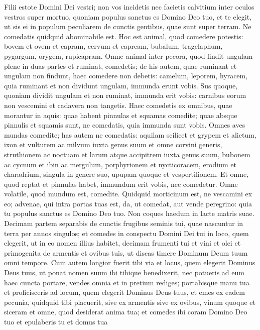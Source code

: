 \begin{biblechapter}
\begin{biblechapter}
\begin{biblechapter}
\begin{biblechapter}
\begin{biblechapter}
\begin{biblechapter}
\begin{biblechapter}
\begin{biblechapter}
\begin{biblechapter}
\begin{biblechapter}
\begin{biblechapter}
\begin{biblechapter}
\begin{biblechapter}
\begin{biblechapter}
 \verse Filii estote Domini Dei vestri; non vos incidetis nec facietis calvitium inter oculos vestros super mortuo, 
\verse quoniam populus sanctus es Domino Deo tuo, et te elegit, ut sis ei in populum peculiarem de cunctis gentibus, quae sunt super terram.
 \verse Ne comedatis quidquid abominabile est.
 \verse Hoc est animal, quod comedere potestis: bovem et ovem et capram, 
\verse cervum et capream, bubalum, tragelaphum, pygargum, orygem, rupicapram. 
\verse Omne animal inter pecora, quod findit ungulam plene in duas partes et ruminat, comedetis; 
\verse de his autem, quae ruminant et ungulam non findunt, haec comedere non debetis: camelum, leporem, hyracem, quia ruminant et non dividunt ungulam, immunda erunt vobis. 
\verse Sus quoque, quoniam dividit ungulam et non ruminat, immunda erit vobis: carnibus eorum non vescemini et cadavera non tangetis.
 \verse Haec comedetis ex omnibus, quae morantur in aquis: quae habent pinnulas et squamas comedite; 
\verse quae absque pinnulis et squamis sunt, ne comedatis, quia immunda sunt vobis.
 \verse Omnes aves mundas comedite; 
\verse has autem ne comedatis: aquilam scilicet et grypem et alietum, 
\verse ixon et vulturem ac milvum iuxta genus suum 
\verse et omne corvini generis, 
\verse struthionem ac noctuam et larum atque accipitrem iuxta genus suum, 
\verse bubonem ac cycnum et ibin 
\verse ac mergulum, porphyrionem et nycticoracem, 
\verse erodium et charadrium, singula in genere suo, upupam quoque et vespertilionem. 
\verse Et omne, quod reptat et pinnulas habet, immundum erit vobis, nec comedetur. 
\verse Omne volatile, quod mundum est, comedite.
 \verse Quidquid morticinum est, ne vescamini ex eo; advenae, qui intra portas tuas est, da, ut comedat, aut vende peregrino: quia tu populus sanctus es Domino Deo tuo.
 Non coques haedum in lacte matris suae.
 \verse Decimam partem separabis de cunctis frugibus seminis tui, quae nascuntur in terra per annos singulos; 
\verse et comedes in conspectu Domini Dei tui in loco, quem elegerit, ut in eo nomen illius habitet, decimam frumenti tui et vini et olei et primogenita de armentis et ovibus tuis, ut discas timere Dominum Deum tuum omni tempore.
 \verse Cum autem longior fuerit tibi via et locus, quem elegerit Dominus Deus tuus, ut ponat nomen suum ibi tibique benedixerit, nec potueris ad eum haec cuncta portare, 
\verse vendes omnia et in pretium rediges; portabisque manu tua et proficisceris ad locum, quem elegerit Dominus Deus tuus, 
\verse et emes ex eadem pecunia, quidquid tibi placuerit, sive ex armentis sive ex ovibus, vinum quoque et siceram et omne, quod desiderat anima tua; et comedes ibi coram Domino Deo tuo et epulaberis tu et domus tua 

\end{biblechapter}
\end{biblechapter}
\end{biblechapter}
\end{biblechapter}
\end{biblechapter}
\end{biblechapter}
\end{biblechapter}
\end{biblechapter}
\end{biblechapter}
\end{biblechapter}
\end{biblechapter}
\end{biblechapter}
\end{biblechapter}
\end{biblechapter}
